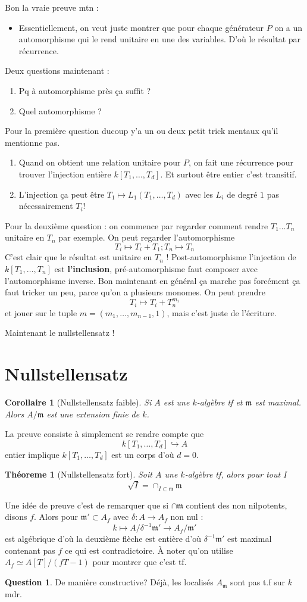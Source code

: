 \documentclass[a4paper,12pt]{book}
\newcommand{\m}{\mathfrak{m}}
\theoremstyle{plain}
\newtheorem{thm}[subsection]{Théoreme}
\newtheorem{cor}[subsection]{Corollaire}
\theoremstyle{definition}
\newtheorem{quest}{Question}
\theoremstyle{remark}
\begin{document}
Bon la vraie preuve mtn :
\begin{itemize}
    \item Essentiellement, on veut juste montrer que pour chaque
	générateur $P$ on a un automorphisme qui le rend unitaire en
	une des variables. D'où le résultat par récurrence.
\end{itemize}
Deux questions maintenant :
\begin{enumerate}
    \item Pq à automorphisme près ça suffit ?
    \item Quel automorphisme ?
\end{enumerate}
Pour la première question ducoup y'a un ou deux petit trick mentaux
qu'il mentionne pas.
\begin{enumerate}
    \item Quand on obtient une relation unitaire pour $P$, on fait une 
	récurrence pour trouver l'injection entière $k[T_1,\ldots,T_d]$.
	Et surtout être entier c'est transitif.
    \item L'injection ça peut être $T_1\mapsto L_1(T_1,\ldots, T_d)$
	avec les $L_i$ de degré $1$ pas nécessairement $T_i$!
\end{enumerate}
Pour la deuxième question : on commence par regarder comment rendre
$T_1\ldots T_n$ unitaire en $T_n$ par exemple. On peut regarder
l'automorphisme 
\[T_i\mapsto T_i+T_1;T_n\mapsto T_n\]
C'est clair que le résultat est unitaire en $T_n$ ! Post-automorphisme
l'injection de $k[T_1,\ldots,T_n]$ est \textbf{l'inclusion}, 
pré-automorphisme faut composer avec l'automorphisme inverse. Bon
maintenant en général ça marche pas forcément ça faut tricker un peu,
parce qu'on a plusieurs monomes.
On peut prendre
\[T_i\mapsto T_i+T_n^{m_i}\]
et jouer sur le tuple $m=(m_1,\ldots,m_{n-1},1)$, mais c'est juste
de l'écriture.

Maintenant le nullstellensatz ! 
\section{Nullstellensatz}
\begin{cor}[Nullstellensatz faible]
    Si $A$ est une $k$-algèbre tf et $\m$ est maximal. Alors 
    $A/\m$ est une extension finie de $k$.
\end{cor}
La preuve consiste à simplement se rendre compte que 
\[k[T_1,\ldots,T_d]\hookrightarrow A\]
entier implique $k[T_1,\ldots, T_d]$ est un corps d'où $d=0$.
\begin{thm}[Nullstellensatz fort]
    Soit $A$ une $k$-algèbre tf, alors pour tout $I$
    \[\sqrt I =\cap_{I\subset \m}\m\]
\end{thm}
Une idée de preuve c'est de remarquer que si $\cap \m$ contient des
non nilpotents, disons $f$. Alors pour $\m'\subset A_f$ avec 
$\delta\colon A\to A_f$ non nul :
\[k\mapsto A/\delta^{-1}\m'\to A_f/\m'\]
est algébrique d'où la deuxième flèche est entière d'où $\delta^{-1}\m'$
est maximal contenant pas $f$ ce qui est contradictoire. À noter
qu'on utilise $A_f\simeq A[T]/(fT-1)$ pour montrer que c'est tf.
\begin{quest}
    De manière constructive? Déjà, les localisés $A_\m$ sont pas t.f sur
    $k$ mdr.
\end{quest}
\end{document}
